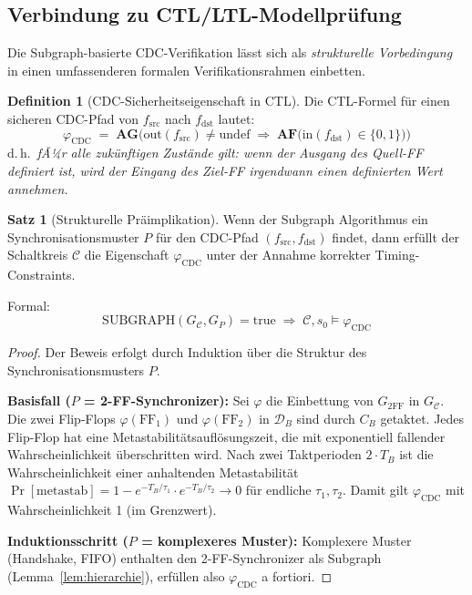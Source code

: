 ﻿\documentclass[a4paper,12pt]{article}
\theoremstyle{definition}
\newtheorem{definition}{Definition}
\newtheorem{satz}{Satz}
\begin{document}
	\subsection{Verbindung zu CTL/LTL-Modellpr\"ufung}
	
	Die Subgraph-basierte CDC-Verifikation l\"asst sich als
	\emph{strukturelle Vorbedingung} in einen umfassenderen
	formalen Verifikationsrahmen einbetten.
	
	\begin{definition}[CDC-Sicherheitseigenschaft in CTL]
		Die CTL-Formel f\"ur einen sicheren CDC-Pfad von $f_{\mathrm{src}}$ nach
		$f_{\mathrm{dst}}$ lautet:
		\[
		\varphi_{\mathrm{CDC}} \;=\;
		\mathbf{AG}\bigl(\mathrm{out}(f_{\mathrm{src}}) \neq \mathrm{undef}
		\;\Rightarrow\;
		\mathbf{AF}\bigl(\mathrm{in}(f_{\mathrm{dst}}) \in \{0, 1\}\bigr)\bigr)
		\]
		d.\,h.\ \emph{fÃ¼r alle zuk\"unftigen Zust\"ande gilt: wenn der Ausgang des
			Quell-FF definiert ist, wird der Eingang des Ziel-FF irgendwann
			einen definierten Wert annehmen.}
	\end{definition}
	
	\begin{satz}[Strukturelle Pr\"aimpl\-ikation]
		\label{satz:ctl}
		Wenn der Subgraph Algorithmus ein Synchronisationsmuster $P$ f\"ur den
		CDC-Pfad $(f_{\mathrm{src}}, f_{\mathrm{dst}})$ findet, dann erf\"ullt
		der Schaltkreis $\mathcal{C}$ die Eigenschaft $\varphi_{\mathrm{CDC}}$
		unter der Annahme korrekter Timing-Constraints.
		
		Formal:
		\[
		\mathrm{SUBGRAPH}(G_{\mathcal{C}}, G_P) = \mathrm{true}
		\;\Rightarrow\;
		\mathcal{C}, s_0 \models \varphi_{\mathrm{CDC}}
		\]
	\end{satz}
	
	\begin{proof}
		Der Beweis erfolgt durch Induktion \"uber die Struktur des Synchronisationsmusters $P$.
		
		\textbf{Basisfall ($P$ = 2-FF-Synchronizer):}
		Sei $\varphi$ die Einbettung von $G_{2\mathrm{FF}}$ in $G_{\mathcal{C}}$.
		Die zwei Flip-Flops $\varphi(\mathrm{FF}_1)$ und $\varphi(\mathrm{FF}_2)$
		in $\mathcal{D}_B$ sind durch $C_B$ getaktet. Jedes Flip-Flop hat eine
		Metastabilit\"atsaufl\"osungszeit, die mit exponentiell fallender
		Wahrscheinlichkeit \"uberschritten wird. Nach zwei Taktperioden $2 \cdot T_B$
		ist die Wahrscheinlichkeit einer anhaltenden Metastabilit\"at
		$\Pr[\text{metastab}] = 1 - e^{-T_B/\tau_1} \cdot e^{-T_B/\tau_2} \to 0$
		f\"ur endliche $\tau_1, \tau_2$. Damit gilt $\varphi_{\mathrm{CDC}}$
		mit Wahrscheinlichkeit 1 (im Grenzwert).
		
		\textbf{Induktionsschritt ($P$ = komplexeres Muster):}
		Komplexere Muster (Handshake, FIFO) enthalten den 2-FF-Synchronizer
		als Subgraph (Lemma~\ref{lem:hierarchie}), erf\"ullen also
		$\varphi_{\mathrm{CDC}}$ a fortiori. \qedhere
	\end{proof}
	
\end{document}
